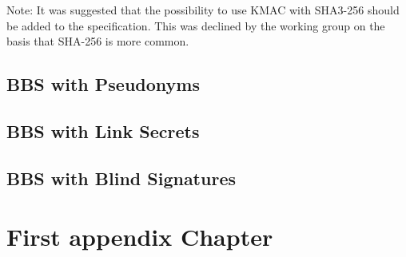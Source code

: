 \documentclass[
	a4paper               %
	,bibliography=totoc   %
	,listof=totoc         %
	,monolingual
	twoside=false,
]{bfhthesis}              %
\begin{document}
Note: It was suggested that the possibility to use KMAC with SHA3-256 should be added to the specification. This was declined by the working group on the basis that SHA-256 is more common.

\section{BBS with Pseudonyms}
\label{chap:Pseudonyms}

\section{BBS with Link Secrets}
\label{chap:linksecrets}

\section{BBS with Blind Signatures}
\label{chap:blindsignatures}




\appendix


\chapter{First appendix Chapter}





\end{document}
